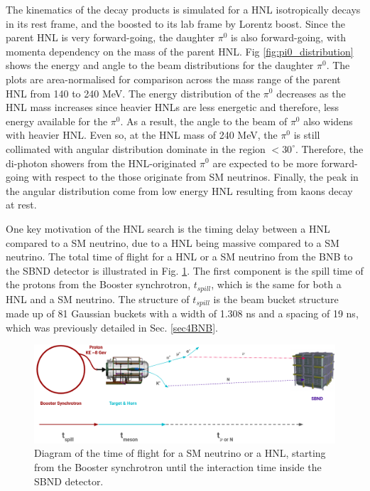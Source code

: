 The kinematics of the decay products is simulated for a HNL isotropically decays in its rest frame, and the boosted to its lab frame by Lorentz boost.
Since the parent HNL is very forward-going, the daughter $\pi^0$ is also forward-going, with momenta dependency on the mass of the parent HNL. 
Fig \ref{fig:pi0_distribution} shows the energy and angle to the beam distributions for the daughter $\pi^0$.
The plots are area-normalised for comparison across the mass range of the parent HNL from 140 to 240 MeV. 
The energy distribution of the $\pi^0$ decreases as the HNL mass increases since heavier HNLs are less energetic and therefore, less energy available for the $\pi^0$.
As a result, the angle to the beam of $\pi^0$ also widens with heavier HNL.
Even so, at the HNL mass of 240 MeV, the $\pi^0$ is still collimated with angular distribution dominate in the region $< 30^\circ$. 
Therefore, the di-photon showers from the HNL-originated $\pi^0$ are expected to be more forward-going with respect to the those originate from SM neutrinos.
Finally, the peak in the angular distribution come from low energy HNL resulting from kaons decay at rest.

One key motivation of the HNL search is the timing delay between a HNL compared to a SM neutrino, due to a HNL being massive compared to a SM neutrino.
The total time of flight for a HNL or a SM neutrino from the BNB to the SBND detector is illustrated in Fig. \ref{fig:tof_beam_to_detector}.
The first component is the spill time of the protons from the Booster synchrotron, $t_{spill}$, which is the same for both a HNL and a SM neutrino.
The structure of $t_{spill}$ is the beam bucket structure made up of 81 Gaussian buckets with a width of 1.308 ns and a spacing of 19 ns, which was previously detailed in Sec. \ref{sec4BNB}.   

\begin{figure}[htbp!] 
\centering    
\includegraphics[width=1.0\textwidth]{tof_beam_to_detector}
\caption[tof_beam_to_detector]{
Diagram of the time of flight for a SM neutrino or a HNL, starting from the Booster synchrotron until the interaction time inside the SBND detector.
}
\label{fig:tof_beam_to_detector}
\end{figure}

